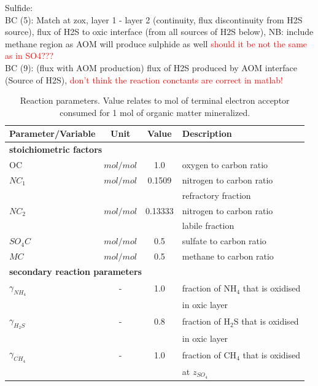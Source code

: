 \documentclass[gmd, manuscript]{copernicus}
\begin{document}
Sulfide:\\
BC (5): Match at zox, layer 1 - layer 2 (continuity, flux discontinuity from H2S source), flux of H2S to oxic interface (from all sources of H2S below), 
NB: include methane region as AOM will produce sulphide as well \textcolor{red}{should it be not the same as in SO4???}\\
BC (9): (flux with AOM production) flux of H2S produced by AOM interface (Source of H2S), \textcolor{red}{don't think the reaction conctants are correct in matlab!}


\begin{table}[hbtp]
\caption{Reaction parameters. Value relates to mol of terminal electron acceptor consumed for 1 mol of organic matter mineralized.}
\centering
\begin{tabular}{l c c l}
\hline\hline
Parameter/Variable & Unit  & Value & Description\\
\hline
\multicolumn{4}{l}{\textbf{stoichiometric factors}}\\
OC & $mol/mol$ & 1.0 & oxygen to carbon ratio\\
$NC_1$ & $mol/mol$ & 0.1509 & nitrogen to carbon ratio\\
& & & refractory fraction\\
$NC_2$ & $mol/mol$ & 0.13333 & nitrogen to carbon ratio\\
& & & labile fraction\\
$SO_4C$ & $mol/mol$ & 0.5 & sulfate to carbon ratio\\
$MC$ & $mol/mol$ & 0.5 & methane to carbon ratio\\
\multicolumn{4}{l}{\textbf{secondary reaction parameters}}\\
$\gamma_{NH_4}$ & - & 1.0 & fraction of NH$_4$ that is oxidised\\
& & & in oxic layer\\
$\gamma_{H_2S}$ & - & 0.8 & fraction of H$_2$S that is oxidised\\
& & & in oxic layer\\
$\gamma_{CH_4}$ & - & 1.0 & fraction of CH$_4$ that is oxidised\\
& & & at $z_{SO_4}$\\
\hline\hline
\end{tabular}
\label{table:reaction_parameters}
\end{table}
\end{document}
